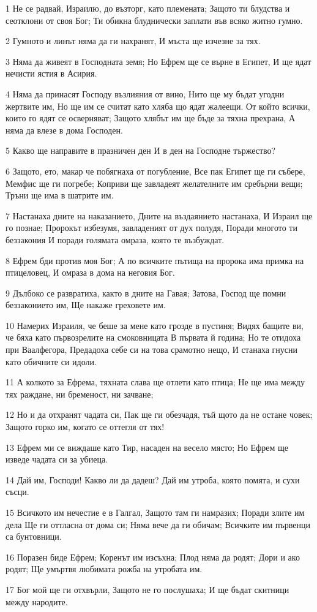 \par 1 Не се радвай, Израилю, до възторг, като племената; Защото ти блудства и сеотклони  от своя Бог; Ти обикна  блуднически  заплати във всяко житно гумно.
\par 2 Гумното и линът няма да ги нахранят, И мъста ще изчезне за тях.
\par 3 Няма да живеят в Господната земя; Но Ефрем ще се върне в Египет, И ще ядат нечисти ястия в Асирия.
\par 4 Няма да принасят Господу възлияния от вино, Нито ще му бъдат угодни жертвите им, Но ще им се считат  като хляба що ядат жалеещи. От който всички, които го ядят се осверняват; Защото хлябът им ще бъде за тяхна прехрана, А няма да влезе в дома Господен.
\par 5 Какво ще направите в празничен ден И в ден на Господне тържество?
\par 6 Защото, ето, макар че побягнаха от погубление, Все пак Египет ще ги събере, Мемфис ще ги погребе; Коприви ще завладеят желателните им сребърни вещи; Тръни ще има в шатрите им.
\par 7 Настанаха дните на наказанието, Дните на въздаянието настанаха, И Израил ще го познае; Пророкът избезумя, завладеният от дух полудя, Поради многото ти беззакония И поради голямата омраза, която те възбуждат.
\par 8 Ефрем бди против моя Бог; А по всичките пътища на пророка има примка на птицеловец, И омраза в дома на неговия Бог.
\par 9 Дълбоко се развратиха, както в дните на Гавая; Затова, Господ ще помни беззаконието им, Ще накаже греховете им.
\par 10 Намерих Израиля, че беше за мене  като грозде в пустиня; Видях бащите ви, че бяха като първозрелите на смоковницата В първата й година; Но те отидоха при Ваалфегора, Предадоха себе си на това срамотно нещо, И станаха гнусни като обичните си идоли.
\par 11 А колкото за Ефрема, тяхната слава ще отлети като птица; Не ще има между тях  раждане, ни бременост, ни зачване;
\par 12 Но и да отхранят чадата си, Пак ще ги обезчадя, тъй щото да не остане човек; Защото горко им, когато се оттегля от тях!
\par 13 Ефрем ми се виждаше като Тир, насаден на весело място; Но Ефрем ще изведе чадата си за убиеца.
\par 14 Дай им, Господи! Какво ли да дадеш? Дай им утроба, която помята, и сухи съсци.
\par 15 Всичкото им нечестие е в Галгал, Защото там ги намразих; Поради злите им дела Ще ги оттласна от дома си; Няма вече да ги обичам; Всичките им първенци са бунтовници.
\par 16 Поразен биде Ефрем; Коренът им изсъхна; Плод няма да родят; Дори и ако родят; Ще умъртвя любимата рожба на утробата им.
\par 17 Бог мой ще ги отхвърли, Защото не го послушаха; И ще бъдат скитници между народите.


